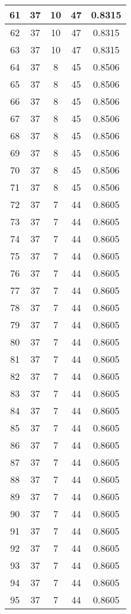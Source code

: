 \documentclass[letterpaper, 12pt]{article}
\begin{document}
\begin{longtable}{|c|c|c|c|c|}
\hline
61 & 37 & 10 & 47 & 0.8315 \\
\hline
62 & 37 & 10 & 47 & 0.8315 \\
\hline
63 & 37 & 10 & 47 & 0.8315 \\
\hline
64 & 37 & 8 & 45 & 0.8506 \\
\hline
65 & 37 & 8 & 45 & 0.8506 \\
\hline
66 & 37 & 8 & 45 & 0.8506 \\
\hline
67 & 37 & 8 & 45 & 0.8506 \\
\hline
68 & 37 & 8 & 45 & 0.8506 \\
\hline
69 & 37 & 8 & 45 & 0.8506 \\
\hline
70 & 37 & 8 & 45 & 0.8506 \\
\hline
71 & 37 & 8 & 45 & 0.8506 \\
\hline
72 & 37 & 7 & 44 & 0.8605 \\
\hline
73 & 37 & 7 & 44 & 0.8605 \\
\hline
74 & 37 & 7 & 44 & 0.8605 \\
\hline
75 & 37 & 7 & 44 & 0.8605 \\
\hline
76 & 37 & 7 & 44 & 0.8605 \\
\hline
77 & 37 & 7 & 44 & 0.8605 \\
\hline
78 & 37 & 7 & 44 & 0.8605 \\
\hline
79 & 37 & 7 & 44 & 0.8605 \\
\hline
80 & 37 & 7 & 44 & 0.8605 \\
\hline
81 & 37 & 7 & 44 & 0.8605 \\
\hline
82 & 37 & 7 & 44 & 0.8605 \\
\hline
83 & 37 & 7 & 44 & 0.8605 \\
\hline
84 & 37 & 7 & 44 & 0.8605 \\
\hline
85 & 37 & 7 & 44 & 0.8605 \\
\hline
86 & 37 & 7 & 44 & 0.8605 \\
\hline
87 & 37 & 7 & 44 & 0.8605 \\
\hline
88 & 37 & 7 & 44 & 0.8605 \\
\hline
89 & 37 & 7 & 44 & 0.8605 \\
\hline
90 & 37 & 7 & 44 & 0.8605 \\
\hline
91 & 37 & 7 & 44 & 0.8605 \\
\hline
92 & 37 & 7 & 44 & 0.8605 \\
\hline
93 & 37 & 7 & 44 & 0.8605 \\
\hline
94 & 37 & 7 & 44 & 0.8605 \\
\hline
95 & 37 & 7 & 44 & 0.8605 \\

\end{longtable}
\end{document}
